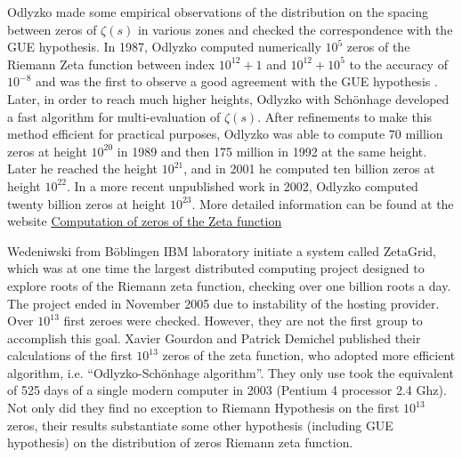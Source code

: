 \documentclass[conference,9pt]{IEEEtran}
\theoremstyle{definition}
\begin{document}

Odlyzko made some empirical observations of the distribution on the spacing between zeros of $\zeta(s)$ in various zones and checked the correspondence with the GUE hypothesis. In 1987, Odlyzko computed numerically $10^5$ zeros of the Riemann Zeta function between index $10^{12}+1$ and $10^{12}+10^5$ to the accuracy of $10^{-8}$ and was the first to observe a good agreement with the GUE hypothesis . Later, in order to reach much higher heights, Odlyzko with Sch{\" o}nhage developed a fast algorithm for multi-evaluation of $\zeta(s)$. After refinements to make this method efficient for practical purposes, Odlyzko was able to compute 70 million zeros at height $10^{20}$ in 1989 and then 175 million in 1992 at the same height. Later he reached the height $10^{21}$, and in 2001 he computed ten billion zeros at height $10^{22}$. In a more recent unpublished work in 2002, Odlyzko computed twenty billion zeros at height $10^{23}$. More detailed information can be found at the website \href{http://numbers.computation.free.fr/Constants/constants.html}{Computation of zeros of the Zeta function}

Wedeniwski from B{\" o}blingen IBM laboratory initiate a system called ZetaGrid, which was at one time the largest distributed computing project designed to explore roots of the Riemann zeta function, checking over one billion roots a day. The project ended in November 2005 due to instability of the hosting provider. Over $10^{13}$ first zeroes were checked. However, they are not the first group to accomplish this goal. Xavier Gourdon and Patrick Demichel published their calculations of the first $10^{13}$ zeros of the zeta function, who adopted more efficient algorithm, i.e. ``Odlyzko-Sch{\" o}nhage algorithm''.\cite{Xavier2004The11} They only use took the equivalent of 525 days of a single modern computer in 2003 (Pentium 4 processor 2.4 Ghz). Not only did they find no exception to Riemann Hypothesis on the first $10^{13}$ zeros, their results substantiate some other hypothesis (including GUE hypothesis) on the distribution of zeros Riemann zeta function.
\end{document}
